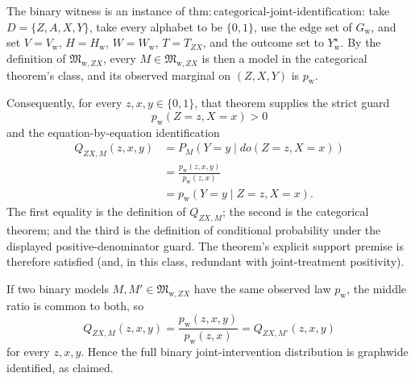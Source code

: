 The binary witness is an instance of \(\mathrm{thm:categorical\text{-}joint\text{-}identification}\): take \(D=\{Z,A,X,Y\}\), take every alphabet to be \(\{0,1\}\), use the edge set of \(G_{\mathrm w}\), and set \(V=V_{\mathrm w}\), \(H=H_{\mathrm w}\), \(W=W_{\mathrm w}\), \(T=T_{ZX}\), and the outcome set to \(Y_{\mathrm w}^{\star}\).  By the definition of \(\mathfrak M_{\mathrm w,ZX}\), every \(M\in\mathfrak M_{\mathrm w,ZX}\) is then a model in the categorical theorem's class, and its observed marginal on \((Z,X,Y)\) is \(p_{\mathrm w}\).

Consequently, for every \(z,x,y\in\{0,1\}\), that theorem supplies the strict guard
\[
 p_{\mathrm w}(Z=z,X=x)>0
\]
and the equation-by-equation identification
\[
\begin{aligned}
 Q_{ZX,M}(z,x,y)
 &=P_M(Y=y\mid do(Z=z,X=x))\\
 &=\frac{p_{\mathrm w}(z,x,y)}{p_{\mathrm w}(z,x)}\\
 &=p_{\mathrm w}(Y=y\mid Z=z,X=x).
\end{aligned}
\]
The first equality is the definition of \(Q_{ZX,M}\); the second is the categorical theorem; and the third is the definition of conditional probability under the displayed positive-denominator guard.  The theorem's explicit support premise is therefore satisfied (and, in this class, redundant with joint-treatment positivity).

If two binary models \(M,M'\in\mathfrak M_{\mathrm w,ZX}\) have the same observed law \(p_{\mathrm w}\), the middle ratio is common to both, so
\[
 Q_{ZX,M}(z,x,y)
 =\frac{p_{\mathrm w}(z,x,y)}{p_{\mathrm w}(z,x)}
 =Q_{ZX,M'}(z,x,y)
\]
for every \(z,x,y\).  Hence the full binary joint-intervention distribution is graphwide identified, as claimed.